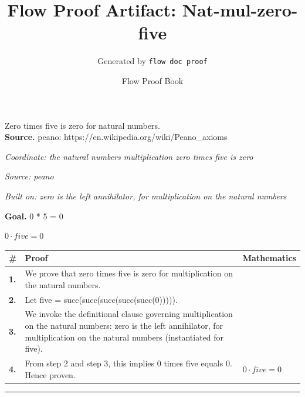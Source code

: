 \documentclass[11pt]{article}
\title{Flow Proof Artifact: Nat-mul-zero-five}
\author{Generated by \texttt{flow doc proof}}
\date{Flow Proof Book}
\theoremstyle{definition}
\begin{document}
\maketitle
Zero times five is zero for natural numbers.\\[0.5em]
\textbf{Source.} peano: https://en.wikipedia.org/wiki/Peano\_axioms\\[0.5em]
\bigskip
{}\par
\smallskip\noindent\textit{Coordinate: the natural numbers \cdot multiplication \cdot zero times five is zero}\par
\smallskip\noindent\textit{Source: peano}\par
\smallskip\noindent\textit{Built on: zero is the left annihilator, for multiplication on the natural numbers}\par
\medskip
\noindent\textbf{Goal.} 0 * 5 = 0\par
\noindent$\displaystyle 0 \cdot five = 0$\par
\medskip
\noindent
\begin{tabular}{@{} >{\raggedright\arraybackslash}p{} >{\raggedright\arraybackslash}p{} >{\raggedleft\arraybackslash}p{} @{}}
\textbf{\#} & \textbf{Proof} & \textbf{Mathematics} \\
\midrule
\textbf{1.} & We prove that zero times five is zero for multiplication on the natural numbers. & \\[0.45em]
\textbf{2.} & Let five = succ(succ(succ(succ(succ(0))))). & \\[0.45em]
\textbf{3.} & We invoke the definitional clause governing multiplication on the natural numbers: zero is the left annihilator, for multiplication on the natural numbers (instantiated for five). & \\[0.45em]
\textbf{4.} & From step 2 and step 3, this implies 0 times five equals 0. Hence proven. & $\displaystyle 0 \cdot five = 0$ \\[0.45em]
\bottomrule
\end{tabular}
\label{thm:Nat-multiplication-zero_times_five_is_zero}
\par\medskip\hrule
\end{document}
